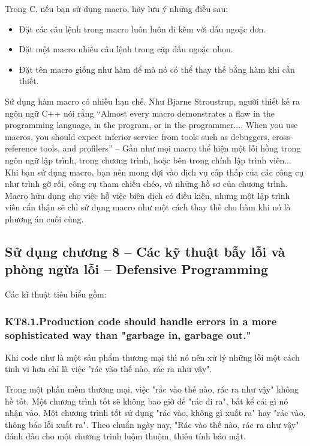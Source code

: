 \documentclass[12pt]{report}
\begin{document}
Trong C, nếu bạn sử dụng macro, hãy lưu ý những điều sau:
\begin{itemize}
	\item Đặt các câu lệnh trong macro luôn luôn đi kèm với dấu ngoặc đơn. 
	\item Đặt một macro nhiều câu lệnh trong cặp dấu ngoặc nhọn. 
	\item Đặt tên macro giống như hàm để mà nó có thể thay thế bằng hàm khi cần thiết. 
\end{itemize}
Sử dụng hàm macro có nhiều hạn chế. Như Bjarne Stroustrup, người thiết kế ra ngôn ngữ C++ nói rằng “Almost every macro
demonstrates a flaw in the programming language, in the program, or in the
programmer.... When you use macros, you should expect inferior service from
tools such as debuggers, cross-reference tools, and profilers” -- Gần như mọi macro thể hiện một lỗi hồng trong ngôn ngữ lập trình, trong chương trình, hoặc bên trong chính lập trình viên... Khi bạn sử dụng macro, bạn nên mong đợi vào dịch vụ cấp thấp của các công cụ như trình gỡ rối,  công cụ tham chiếu chéo, và những hồ sơ của chương trình. Macro hữu dụng cho việc hỗ việc biên dịch có điều kiện, nhưng một lập trình viên cẩn thận sẽ chỉ sử dụng macro như một cách thay thế cho hàm khi nó là phương án cuối cùng. 

\subsection{Sử dụng chương 8 – Các kỹ thuật bẫy lỗi và phòng ngừa lỗi -- Defensive Programming}
\noindent Các kĩ thuật tiêu biểu gồm:

\subsubsection{KT8.1.Production code should handle errors in a more sophisticated way than "garbage in, garbage out."}
Khi code như là một sản phẩm thương mại thì nó nên xử lý những lỗi một cách tinh vi hơn chỉ là việc "rác vào thế nào, rác ra như vậy".
\vspace*{3mm}


Trong một phần mềm thương mại, việc "rác vào thế nào, rác ra như vậy"  không hề tốt. Một chương trình tốt sẽ không bao giờ để "rác đi ra", bất kể cái gì nó nhận vào. Một chương trình tốt sử dụng "rác vào, không gì xuất ra" hay "rác vào, thông báo lỗi xuất ra". Theo chuẩn ngày nay, "Rác vào thế nào, rác ra như vậy" đánh dấu cho một chương trình luộm thuộm, thiếu tính bảo mật. 
\end{document}
